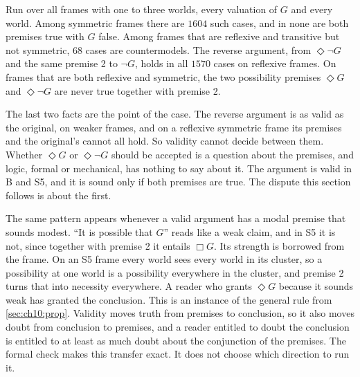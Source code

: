 \begin{example}\label{ex:ch10:exhaustive}
Run over all frames with one to three worlds, every valuation of $G$ and every world. Among symmetric frames there are $1604$ such cases, and in none are both premises true with $G$ false. Among frames that are reflexive and transitive but not symmetric, $68$ cases are countermodels. The reverse argument, from $\Diamond\neg G$ and the same premise 2 to $\neg G$, holds in all $1570$ cases on reflexive frames. On frames that are both reflexive and symmetric, the two possibility premises $\Diamond G$ and $\Diamond\neg G$ are never true together with premise 2.
\end{example}

The last two facts are the point of the case. The reverse argument is as valid as the original, on weaker frames, and on a reflexive symmetric frame its premises and the original's cannot all hold. So validity cannot decide between them. Whether $\Diamond G$ or $\Diamond\neg G$ should be accepted is a question about the premises, and logic, formal or mechanical, has nothing to say about it. The argument is valid in B and S5, and it is sound only if both premises are true. The dispute this section follows is about the first.

The same pattern appears whenever a valid argument has a modal premise that sounds modest. ``It is possible that $G$'' reads like a weak claim, and in S5 it is not, since together with premise 2 it entails $\Box G$. Its strength is borrowed from the frame. On an S5 frame every world sees every world in its cluster, so a possibility at one world is a possibility everywhere in the cluster, and premise 2 turns that into necessity everywhere. A reader who grants $\Diamond G$ because it sounds weak has granted the conclusion. This is an instance of the general rule from \cref{sec:ch10:prop}. Validity moves truth from premises to conclusion, so it also moves doubt from conclusion to premises, and a reader entitled to doubt the conclusion is entitled to at least as much doubt about the conjunction of the premises. The formal check makes this transfer exact. It does not choose which direction to run it.


